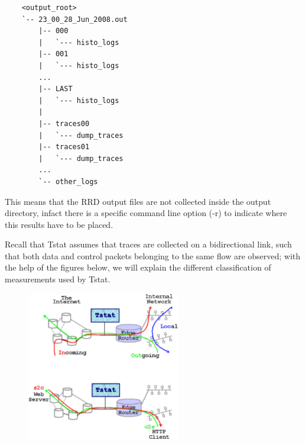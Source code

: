 \documentclass[11pt]{article}
\begin{document}
\begin{small}\begin{verbatim}
    <output_root>
    `-- 23_00_28_Jun_2008.out
        |-- 000
        |   `--- histo_logs
        |-- 001
        |   `--- histo_logs
        ...
        |-- LAST
        |   `--- histo_logs
        |
        |-- traces00
        |   `--- dump_traces
        |-- traces01
        |   `--- dump_traces
        ...
        `-- other_logs
\end{verbatim}\end{small} \noindent
This means that the RRD output files are not collected inside the output directory, 
infact there is a specific command line option (-r) to indicate where this results 
have to be placed.



Recall that Tstat assumes that traces are collected on a bidirectional link,
such that both data and control packets belonging to the same flow are observed;
with the help of the figures below, we will explain the different classification
of measurements used by Tstat.



         \begin{figure}[!htb]
             \begin{center}
                 \includegraphics[width=0.6\textwidth]{tstat_output.eps}
             \end{center}
         \end{figure}
\end{document}

